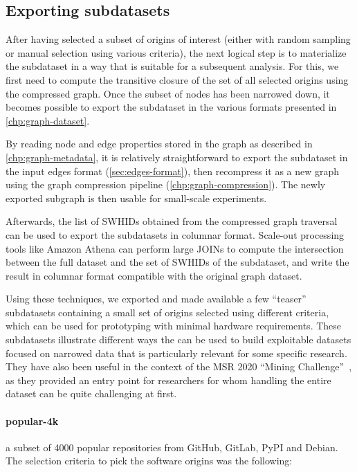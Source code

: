 \subsection{Exporting subdatasets}

After having selected a subset of origins of interest (either with random
sampling or manual selection using various criteria), the next logical step is
to materialize the subdataset in a way that is suitable for a subsequent
analysis.
For this, we first need to compute the transitive closure of the set of all
selected origins using the compressed graph. Once the subset of nodes has been
narrowed down, it becomes possible to export the subdataset in the various
formats presented in \cref{chp:graph-dataset}.

By reading node and edge properties stored in the graph as described in
\cref{chp:graph-metadata}, it is relatively straightforward to export the
subdataset in the input edges format (\cref{sec:edges-format}), then recompress
it as a new graph using the graph compression pipeline
(\cref{chp:graph-compression}). The newly exported subgraph is then usable for
small-scale experiments.

Afterwards, the list of \glspl{SWHID} obtained from the compressed graph
traversal can be used to export the subdatasets in columnar format. Scale-out
processing tools like Amazon Athena can perform large JOINs to compute the
intersection between the full dataset and the set of \glspl{SWHID} of the
subdataset, and write the result in columnar format compatible with the
original graph dataset.

Using these techniques, we exported and made available a few ``teaser''
subdatasets containing a small set of origins selected using different
criteria, which can be used for prototyping with minimal hardware requirements.
These subdatasets illustrate different ways the \SWHGD{} can be used to build
exploitable datasets focused on narrowed data that is particularly relevant for
some specific research. They have also been useful in the context of the
MSR 2020 ``Mining Challenge''~\cite{msr-2020-challenge}, as they provided an
entry point for researchers for whom handling the entire dataset can be quite
challenging at first.

\paragraph{popular-4k} a subset of 4000 popular repositories from
GitHub, GitLab, PyPI and Debian. The selection criteria to pick the software
origins was the following:

